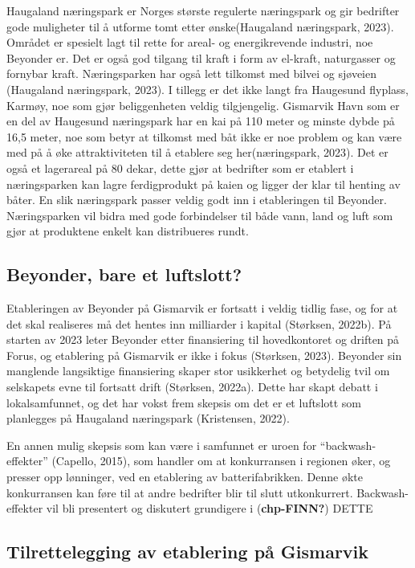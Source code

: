 \documentclass[
]{article}
\begin{document}
Haugaland næringspark er Norges største regulerte næringspark og gir
bedrifter gode muligheter til å utforme tomt etter ønske(Haugaland
næringspark, 2023). Området er spesielt lagt til rette for areal- og
energikrevende industri, noe Beyonder er. Det er også god tilgang til
kraft i form av el-kraft, naturgasser og fornybar kraft. Næringsparken
har også lett tilkomst med bilvei og sjøveien (Haugaland næringspark,
2023). I tillegg er det ikke langt fra Haugesund flyplass, Karmøy, noe
som gjør beliggenheten veldig tilgjengelig. Gismarvik Havn som er en del
av Haugesund næringspark har en kai på 110 meter og minste dybde på 16,5
meter, noe som betyr at tilkomst med båt ikke er noe problem og kan være
med på å øke attraktiviteten til å etablere seg her(næringspark, 2023).
Det er også et lagerareal på 80 dekar, dette gjør at bedrifter som er
etablert i næringsparken kan lagre ferdigprodukt på kaien og ligger der
klar til henting av båter. En slik næringspark passer veldig godt inn i
etableringen til Beyonder. Næringsparken vil bidra med gode forbindelser
til både vann, land og luft som gjør at produktene enkelt kan
distribueres rundt.

\hypertarget{beyonder-bare-et-luftslott}{%
\subsection{Beyonder, bare et
luftslott?}\label{beyonder-bare-et-luftslott}}

Etableringen av Beyonder på Gismarvik er fortsatt i veldig tidlig fase,
og for at det skal realiseres må det hentes inn milliarder i kapital
(Størksen, 2022b). På starten av 2023 leter Beyonder etter finansiering
til hovedkontoret og driften på Forus, og etablering på Gismarvik er
ikke i fokus (Størksen, 2023). Beyonder sin manglende langsiktige
finansiering skaper stor usikkerhet og betydelig tvil om selskapets evne
til fortsatt drift (Størksen, 2022a). Dette har skapt debatt i
lokalsamfunnet, og det har vokst frem skepsis om det er et luftslott som
planlegges på Haugaland næringspark (Kristensen, 2022).

En annen mulig skepsis som kan være i samfunnet er uroen for
``backwash-effekter'' (Capello, 2015), som handler om at konkurransen i
regionen øker, og presser opp lønninger, ved en etablering av
batterifabrikken. Denne økte konkurransen kan føre til at andre
bedrifter blir til slutt utkonkurrert. Backwash-effekter vil bli
presentert og diskutert grundigere i (\textbf{chp-FINN?}) DETTE

\hypertarget{tilrettelegging-av-etablering-puxe5-gismarvik}{%
\subsection{Tilrettelegging av etablering på
Gismarvik}\label{tilrettelegging-av-etablering-puxe5-gismarvik}}
\end{document}
